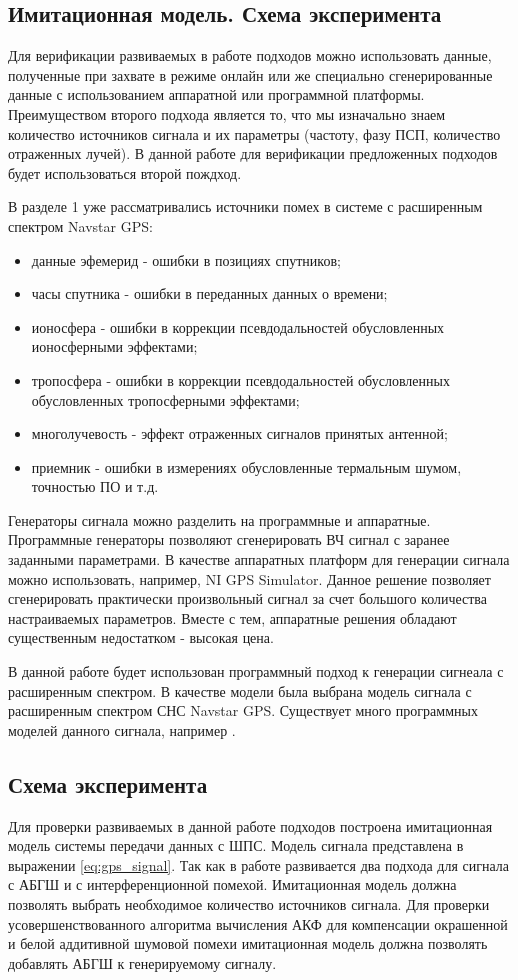 \subsection{Имитационная модель. Схема эксперимента}

Для верификации развиваемых в работе подходов можно использовать данные, полученные при захвате в режиме онлайн или же
специально сгенерированные данные с использованием аппаратной или программной платформы. Преимуществом второго подхода
является то, что мы изначально знаем количество источников сигнала и их параметры (частоту, фазу ПСП, количество отраженных лучей).
В данной работе для верификации предложенных подходов будет использоваться второй пождход.

В разделе 1 уже рассматривались источники помех в системе с расширенным спектром Navstar GPS:
\begin{itemize}
	\item {данные эфемерид - ошибки в позициях спутников;}
	\item {часы спутника - ошибки в переданных данных о времени;}
	\item {ионосфера - ошибки в коррекции псевдодальностей обусловленных ионосферными эффектами;}
	\item {тропосфера - ошибки в коррекции псевдодальностей обусловленных обусловленных тропосферными эффектами;}
	\item {многолучевость - эффект отраженных сигналов принятых антенной;}
	\item {приемник - ошибки в измерениях обусловленные термальным шумом, точностью ПО и т.д.}
\end{itemize}

Генераторы сигнала можно разделить на программные и аппаратные. Программные генераторы позволяют сгенерировать
ВЧ сигнал с заранее заданными параметрами. В качестве аппаратных платформ для генерации сигнала можно использовать, например,
NI GPS Simulator. Данное решение позволяет сгенерировать практически произвольный сигнал за
счет большого количества настраиваемых параметров. Вместе с тем, аппаратные решения обладают существенным недостатком - высокая цена.

В данной работе будет использован программный подход к генерации сигнеала с расширенным спектром. В качестве модели была выбрана модель
сигнала с расширенным спектром СНС Navstar GPS. Существует много программных моделей данного сигнала,
например \cite{hannah_phd, burns_model, corbell_model, crs_model, brown_model}.

\subsection{Схема эксперимента}
Для проверки развиваемых в данной работе подходов построена имитационная модель системы передачи данных с ШПС.
Модель сигнала представлена в выражении \ref{eq:gps_signal}. Так как в работе развивается два подхода для сигнала
с АБГШ и с интерференционной помехой. Имитационная модель должна позволять выбрать необходимое количество источников сигнала.
Для проверки усовершенствованного алгоритма вычисления АКФ для компенсации окрашенной и белой аддитивной шумовой помехи
имитационная модель должна позволять добавлять АБГШ к генерируемому сигналу. 

